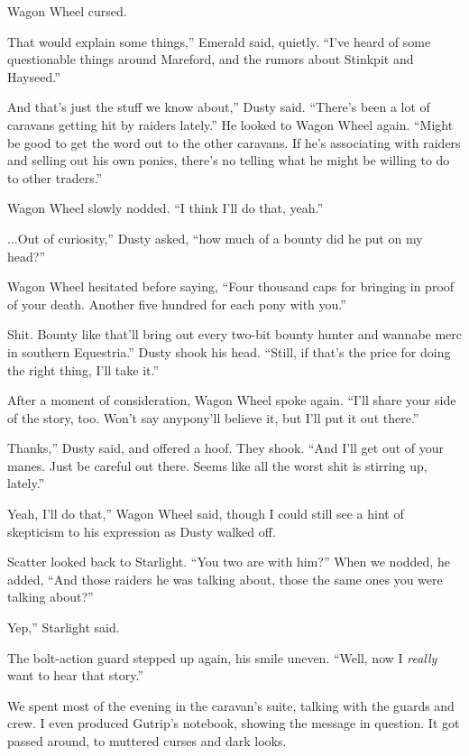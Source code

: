 Wagon Wheel cursed.

\leavevmode{}That would explain some things,” Emerald said, quietly. “I’ve heard of some questionable things around Mareford, and the rumors about Stinkpit and Hayseed.”

\leavevmode{}And that’s just the stuff we know about,” Dusty said. “There’s been a lot of caravans getting hit by raiders lately.” He looked to Wagon Wheel again. “Might be good to get the word out to the other caravans. If he’s associating with raiders and selling out his own ponies, there’s no telling what he might be willing to do to other traders.”

Wagon Wheel slowly nodded. “I think I’ll do that, yeah.”

\leavevmode{}...Out of curiosity,” Dusty asked, “how much of a bounty did he put on my head?”

Wagon Wheel hesitated before saying, “Four thousand caps for bringing in proof of your death. Another five hundred for each pony with you.”

\leavevmode{}Shit. Bounty like that’ll bring out every two-bit bounty hunter and wannabe merc in southern Equestria.” Dusty shook his head. “Still, if that’s the price for doing the right thing, I’ll take it.”

After a moment of consideration, Wagon Wheel spoke again. “I’ll share your side of the story, too. Won’t say anypony’ll believe it, but I’ll put it out there.”

\leavevmode{}Thanks,” Dusty said, and offered a hoof. They shook. “And I’ll get out of your manes. Just be careful out there. Seems like all the worst shit is stirring up, lately.”

\leavevmode{}Yeah, I’ll do that,” Wagon Wheel said, though I could still see a hint of skepticism to his expression as Dusty walked off.

Scatter looked back to Starlight. “You two are with him?” When we nodded, he added, “And those raiders he was talking about, those the same ones you were talking about?”

\leavevmode{}Yep,” Starlight said.

The bolt-action guard stepped up again, his smile uneven. “Well, now I \textit{really} want to hear that story.”

{\br}%
We spent most of the evening in the caravan’s suite, talking with the guards and crew. I even produced Gutrip’s notebook, showing the message in question. It got passed around, to muttered curses and dark looks.

